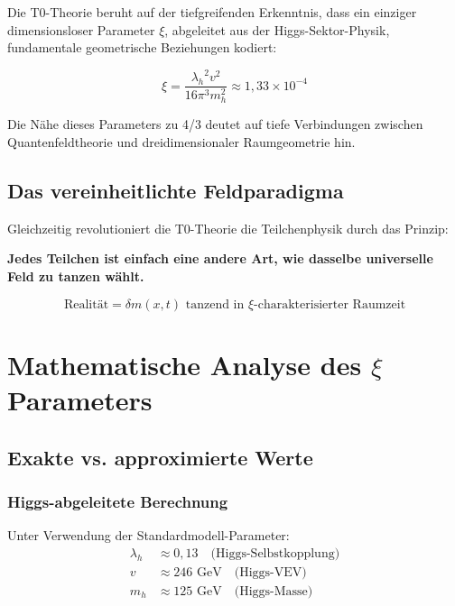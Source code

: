 \documentclass[12pt,a4paper]{article}
\newcommand{\xipar}{\ensuremath{\xi}}
\newcommand{\deltafield}{\ensuremath{\delta m}}
\newcommand{\lambdah}{\ensuremath{\lambda_h}}
\newcommand{\mypi}{\ensuremath{\pi}}
\newcommand{\mytimes}{\ensuremath{\times}}
\newcommand{\myapprox}{\ensuremath{\approx}}
\begin{document}
	Die T0-Theorie beruht auf der tiefgreifenden Erkenntnis, dass ein einziger dimensionsloser Parameter $\xi$, abgeleitet aus der Higgs-Sektor-Physik, fundamentale geometrische Beziehungen kodiert:
	
	\begin{equation}
		\xipar = \frac{\lambdah^2 v^2}{16\mypi^3 m_h^2} \myapprox 1,33 \mytimes 10^{-4}
		\label{eq:xi_fundamental}
	\end{equation}
	
	Die Nähe dieses Parameters zu 4/3 deutet auf tiefe Verbindungen zwischen Quantenfeldtheorie und dreidimensionaler Raumgeometrie hin.
	
	\subsection{Das vereinheitlichte Feldparadigma}
	\label{subsec:vereinheitlichtes_feld}
	
	Gleichzeitig revolutioniert die T0-Theorie die Teilchenphysik durch das Prinzip:
	
	\begin{tcolorbox}[colback=blue!5!white,colframe=blue!75!black,title=Zentrales T0-Prinzip]
		\textbf{Jedes Teilchen ist einfach eine andere Art, wie dasselbe universelle Feld zu tanzen wählt.}
		
		\begin{equation}
			\boxed{\text{Realität} = \deltafield(x,t) \text{ tanzend in } \xipar \text{-charakterisierter Raumzeit}}
			\label{eq:fundamentale_realitaet}
		\end{equation}
	\end{tcolorbox}
	
	\section{Mathematische Analyse des $\xi$ Parameters}
	\label{sec:xi_analyse}
	
	\subsection{Exakte vs. approximierte Werte}
	\label{subsec:exakt_vs_approximiert}
	
	\subsubsection{Higgs-abgeleitete Berechnung}
	\label{subsubsec:higgs_berechnung}
	
	Unter Verwendung der Standardmodell-Parameter:
	\begin{align}
		\lambdah &\myapprox 0,13 \quad \text{(Higgs-Selbstkopplung)} \\
		v &\myapprox 246 \text{ GeV} \quad \text{(Higgs-VEV)} \\
		m_h &\myapprox 125 \text{ GeV} \quad \text{(Higgs-Masse)}
	\end{align}
	
\end{document}
